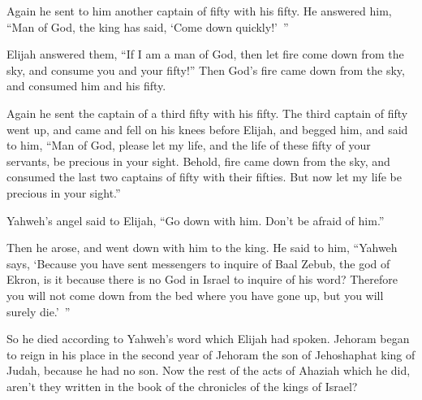 {\par }{\PP {}Again he sent to him another captain of fifty with his fifty. He answered him, “Man of God, the king has said, ‘Come down quickly!’ ”
\par }{\PP {}Elijah answered them, “If I am a man of God, then let fire come down from the sky, and consume you and your fifty!” Then God’s fire came down from the sky, and consumed him and his fifty.
\par }{\PP {}Again he sent the captain of a third fifty with his fifty. The third captain of fifty went up, and came and fell on his knees before Elijah, and begged him, and said to him, “Man of God, please let my life, and the life of these fifty of your servants, be precious in your sight.
Behold, fire came down from the sky, and consumed the last two captains of fifty with their fifties. But now let my life be precious in your sight.”
\par }{\PP {}Yahweh’s angel said to Elijah, “Go down with him. Don’t be afraid of him.”
\par }{\PP Then he arose, and went down with him to the king.
He said to him, “Yahweh says, ‘Because you have sent messengers to inquire of Baal Zebub, the god of Ekron, is it because there is no God in Israel to inquire of his word? Therefore you will not come down from the bed where you have gone up, but you will surely die.’ ”
\par }{\PP {}So he died according to Yahweh’s word which Elijah had spoken. Jehoram began to reign in his place in the second year of Jehoram the son of Jehoshaphat king of Judah, because he had no son.
Now the rest of the acts of Ahaziah which he did, aren’t they written in the book of the chronicles of the kings of Israel?

}
